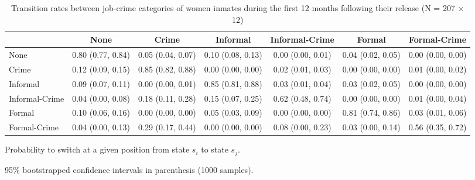 \begin{table}[htp]
\scriptsize
\setlength{\tabcolsep}{10pt}
\renewcommand{\arraystretch}{1.3}
\begin{threeparttable}
\centering
\caption{Transition rates between job-crime categories of women inmates \newline
    during the first 12 months following their release (N = 207 $\times$ 12)} 
\label{tab:transition_rates_job_crime}
\begin{tabular}{lcccccc}
  \hline
 & None & Crime & Informal & Informal-Crime & Formal & Formal-Crime \\ 
  \hline
None & 0.80 (0.77, 0.84) & 0.05 (0.04, 0.07) & 0.10 (0.08, 0.13) & 0.00 (0.00, 0.01) & 0.04 (0.02, 0.05) & 0.00 (0.00, 0.00) \\ 
  Crime & 0.12 (0.09, 0.15) & 0.85 (0.82, 0.88) & 0.00 (0.00, 0.00) & 0.02 (0.01, 0.03) & 0.00 (0.00, 0.00) & 0.01 (0.00, 0.02) \\ 
  Informal & 0.09 (0.07, 0.11) & 0.00 (0.00, 0.01) & 0.85 (0.81, 0.88) & 0.03 (0.01, 0.04) & 0.03 (0.02, 0.05) & 0.00 (0.00, 0.00) \\ 
  Informal-Crime & 0.04 (0.00, 0.08) & 0.18 (0.11, 0.28) & 0.15 (0.07, 0.25) & 0.62 (0.48, 0.74) & 0.00 (0.00, 0.00) & 0.01 (0.00, 0.04) \\ 
  Formal & 0.10 (0.06, 0.16) & 0.00 (0.00, 0.00) & 0.05 (0.03, 0.09) & 0.00 (0.00, 0.00) & 0.81 (0.74, 0.86) & 0.03 (0.01, 0.06) \\ 
  Formal-Crime & 0.04 (0.00, 0.13) & 0.29 (0.17, 0.44) & 0.00 (0.00, 0.00) & 0.08 (0.00, 0.23) & 0.03 (0.00, 0.14) & 0.56 (0.35, 0.72) \\ 
   \hline
\end{tabular}
\begin{tablenotes}
\scriptsize
\item Probability to switch at a given position from state $s_i$ to state $s_j$. 
    \item 95\% bootstrapped confidence intervals in parenthesis (1000 samples).
\end{tablenotes}
\end{threeparttable}
\end{table}
